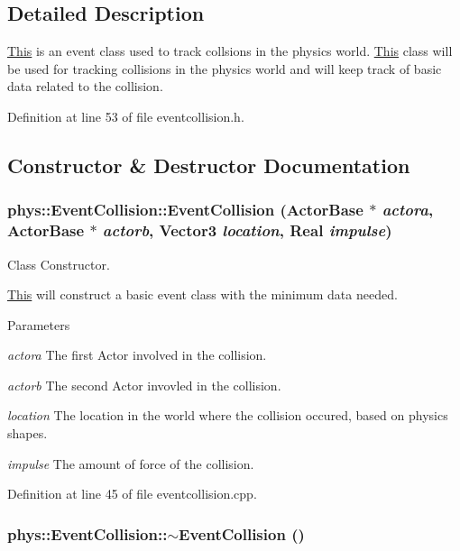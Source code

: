 \subsection{Detailed Description}
\hyperlink{structThis}{This} is an event class used to track collsions in the physics world. \hyperlink{structThis}{This} class will be used for tracking collisions in the physics world and will keep track of basic data related to the collision. 

Definition at line 53 of file eventcollision.h.



\subsection{Constructor \& Destructor Documentation}
\hypertarget{classphys_1_1EventCollision_ac191dc44f83f6ddd2bff4f233b354372}{
\subsubsection[{EventCollision}]{\setlength{\rightskip}{0pt plus 5cm}phys::EventCollision::EventCollision ({\bf ActorBase} $\ast$ {\em actora}, \/  {\bf ActorBase} $\ast$ {\em actorb}, \/  {\bf Vector3} {\em location}, \/  {\bf Real} {\em impulse})}}
\label{dd/de9/classphys_1_1EventCollision_ac191dc44f83f6ddd2bff4f233b354372}


Class Constructor. 

\hyperlink{structThis}{This} will construct a basic event class with the minimum data needed. 
\begin{DoxyParams}{Parameters}
\item[{\em actora}]The first Actor involved in the collision. \item[{\em actorb}]The second Actor invovled in the collision. \item[{\em location}]The location in the world where the collision occured, based on physics shapes. \item[{\em impulse}]The amount of force of the collision. \end{DoxyParams}


Definition at line 45 of file eventcollision.cpp.

\hypertarget{classphys_1_1EventCollision_afcbf057fc955ce6c05b21c08325b1822}{
\subsubsection[{$\sim$EventCollision}]{\setlength{\rightskip}{0pt plus 5cm}phys::EventCollision::$\sim$EventCollision ()}}
\label{dd/de9/classphys_1_1EventCollision_afcbf057fc955ce6c05b21c08325b1822}


